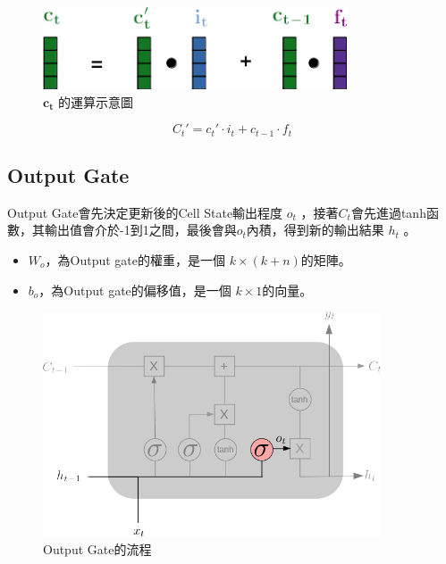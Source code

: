 \begin{figure}[H]
	\centering
	\includegraphics[width=9cm]{./pic/Qff4EdKi.png}
	\caption{\(\mathbf{c_t}\) 的運算示意圖}
	\label{fig:CellStateUpdateCaculate}
\end{figure}

\begin{equation}
	\label{eqn:InputCalculate}
	C_t' = c_t'\cdot i_t + c_{t-1}\cdot f_t 
\end{equation}



\subsection{Output Gate}

Output Gate會先決定更新後的Cell State輸出程度 \(o_t\) ，接著\(C_t\)會先進過tanh函數，其輸出值會介於-1到1之間，最後會與\(o_t\)內積，得到新的輸出結果 \(h_t\) 。

\begin{itemize}

	\item 
		\(W_o\)，為Output gate的權重，是一個 \(k \times (k+n)\)的矩陣。

	\item 
		\(b_o\)，為Output gate的偏移值，是一個 \(k \times 1\)的向量。

\end{itemize}

\begin{figure}[H]
	\centering
	\includegraphics[width=10cm]{./pic/e9dbHfq4.png}
	\caption{Output Gate的流程}
	\label{fig:OutputGate}
\end{figure}


